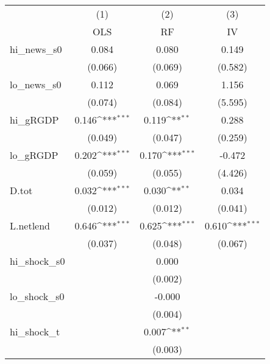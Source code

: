 {
\def\sym#1{\ifmmode^{#1}\else\(^{#1}\)\fi}
\begin{tabular}{l*{3}{c}}
\toprule
            &\multicolumn{1}{c}{(1)}&\multicolumn{1}{c}{(2)}&\multicolumn{1}{c}{(3)}\\
            &\multicolumn{1}{c}{OLS}&\multicolumn{1}{c}{RF}&\multicolumn{1}{c}{IV}\\
\midrule
hi\_news\_s0  &       0.084         &       0.080         &       0.149         \\
            &     (0.066)         &     (0.069)         &     (0.582)         \\
\addlinespace
lo\_news\_s0  &       0.112         &       0.069         &       1.156         \\
            &     (0.074)         &     (0.084)         &     (5.595)         \\
\addlinespace
hi\_gRGDP    &       0.146\sym{***}&       0.119\sym{**} &       0.288         \\
            &     (0.049)         &     (0.047)         &     (0.259)         \\
\addlinespace
lo\_gRGDP    &       0.202\sym{***}&       0.170\sym{***}&      -0.472         \\
            &     (0.059)         &     (0.055)         &     (4.426)         \\
\addlinespace
D.tot       &       0.032\sym{***}&       0.030\sym{**} &       0.034         \\
            &     (0.012)         &     (0.012)         &     (0.041)         \\
\addlinespace
L.netlend   &       0.646\sym{***}&       0.625\sym{***}&       0.610\sym{***}\\
            &     (0.037)         &     (0.048)         &     (0.067)         \\
\addlinespace
hi\_shock\_s0 &                     &       0.000         &                     \\
            &                     &     (0.002)         &                     \\
\addlinespace
lo\_shock\_s0 &                     &      -0.000         &                     \\
            &                     &     (0.004)         &                     \\
\addlinespace
hi\_shock\_t  &                     &       0.007\sym{**} &                     \\
            &                     &     (0.003)         &                     \\

\end{tabular}}
